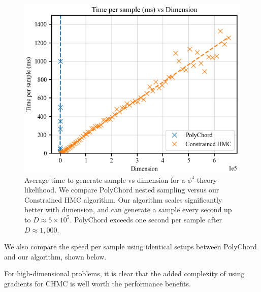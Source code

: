 \documentclass[11pt]{article}
\begin{document}
    \begin{figure}[h!]
        \center
        \includegraphics[width=\linewidth]{../figures/Performance}
        \caption{
            Average time to generate sample vs dimension for a $\phi^4$-theory likelihood.
            We compare PolyChord nested sampling versus our Constrained HMC algorithm.
            Our algorithm scales significantly better with dimension, and can generate a sample every second up to
            $D \approx 5 \times 10^5$.
            PolyChord exceeds one second per sample after $D \approx 1,000$.
        }\label{fig:performance}
    \end{figure}

    We also compare the speed per sample using identical setups between PolyChord and our algorithm, shown below.

    For high-dimensional problems, it is clear that the added complexity of using gradients for CHMC is well worth the
    performance benefits.
\end{document}
